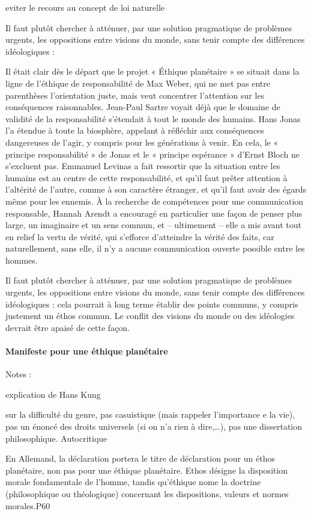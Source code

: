         eviter le recours au concept de loi naturelle
\begin{singlequote}
        
        Il faut plutôt chercher à atténuer, par une solution pragmatique de problèmes urgents, les oppositions entre visions du monde, sans tenir compte des différences idéologiques :

            Il était clair dès le départ que le projet « Éthique planétaire » se situait dans la ligne de l’éthique de responsabilité de Max Weber, qui ne met pas entre parenthèses l’orientation juste, mais veut concentrer l’attention sur les conséquences raisonnables. Jean-Paul Sartre voyait déjà que le domaine de validité de la responsabilité s’étendait à tout le monde des humains. Hans Jonas l’a étendue à toute la biosphère, appelant à réfléchir aux conséquences dangereuses de l’agir, y compris pour les générations à venir. En cela, le « principe responsabilité » de Jonas et le « principe espérance » d’Ernst Bloch ne s’excluent pas. Emmanuel Levinas a fait ressortir que la situation entre les humains est au centre de cette responsabilité, et qu’il faut prêter attention à l’altérité de l’autre, comme à son caractère étranger, et qu’il faut avoir des égards même pour les ennemis. À la recherche de compétences pour une communication responsable, Hannah Arendt a encouragé en particulier une façon de penser plus large, un imaginaire et un sens commun, et – ultimement – elle a mis avant tout en relief la vertu de vérité, qui s’efforce d’atteindre la vérité des faits, car naturellement, sans elle, il n’y a aucune communication ouverte possible entre les hommes.

            Il faut plutôt chercher à atténuer, par une solution pragmatique de problèmes urgents, les oppositions entre visions du monde, sans tenir compte des différences idéologiques : cela pourrait à long terme établir des points communs, y compris justement un éthos commun. Le conflit des visions du monde ou des idéologies devrait être apaisé de cette façon.
\end{singlequote}

\paragraph{Manifeste pour une éthique planétaire}
    \cite{kuschel_manifeste_1995}
    Notes :

        explication de Hans Kung

        sur la difficulté du genre, pas casuistique (mais rappeler l’importance e la vie), pas un énoncé des droits universels (si on n’a rien à dire,…), pas une dissertation philosophique. Autocritique
\begin{singlequote}
En Allemand, la déclaration portera le titre de déclaration pour un éthos planétaire, non pas pour une éthique planétaire. Ethos désigne la disposition morale fondamentale de l’homme, tandis qu’éthique nome la doctrine (philosophique ou théologique) concernant les dispositions, valeurs et normes morales.P60
\end{singlequote}


